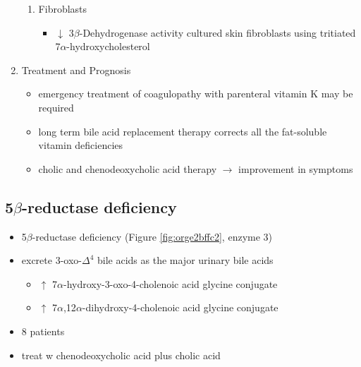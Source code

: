 \documentclass{scrartcl}
\begin{document}
\begin{enumerate}
\begin{enumerate}
\item Fibroblasts
\label{sec:org4124cc3}
\begin{itemize}
\item \(\downarrow\) 3\(\beta\)-Dehydrogenase activity cultured skin fibroblasts using
tritiated 7\(\alpha\)-hydroxycholesterol
\end{itemize}
\end{enumerate}

\item Treatment and Prognosis
\label{sec:orgf1dbf75}
\begin{itemize}
\item emergency treatment of coagulopathy with parenteral vitamin K may be required
\item long term bile acid replacement therapy corrects all the fat-soluble
vitamin deficiencies

\item cholic and chenodeoxycholic acid therapy \(\to\) improvement in symptoms
\end{itemize}
\end{enumerate}

\subsection{5\(\beta\)-reductase deficiency}
\label{sec:orge36784a}
\begin{itemize}
\item 5\(\beta\)-reductase deficiency (Figure \ref{fig:orge2bffc2}, enzyme 3)
\item excrete 3-oxo-\(\Delta^{\text{4}}\) bile acids as the major urinary bile acids
\begin{itemize}
\item \(\uparrow\) 7\(\alpha\)-hydroxy-3-oxo-4-cholenoic acid glycine conjugate
\item \(\uparrow\) 7\(\alpha\),12\(\alpha\)-dihydroxy-4-cholenoic acid glycine conjugate
\end{itemize}
\item 8 patients
\item treat w chenodeoxycholic acid plus cholic acid
\end{itemize}
\end{document}
